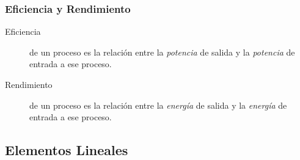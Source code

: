 \documentclass[serif, xcolor=dvipsnames]{beamer}
\begin{document}
\begin{frame}
  \frametitle{Eficiencia y Rendimiento}
  \begin{description}
  \item [{Eficiencia}] de un proceso es la relación entre la
    \emph{potencia} de salida y la \emph{potencia} de entrada a ese
    proceso.
  \item [{Rendimiento}] de un proceso es la relación entre la
    \emph{energía} de salida y la \emph{energía} de entrada a ese
    proceso.
  \end{description}

\end{frame}


\subsection{Elementos Lineales}
\end{document}
